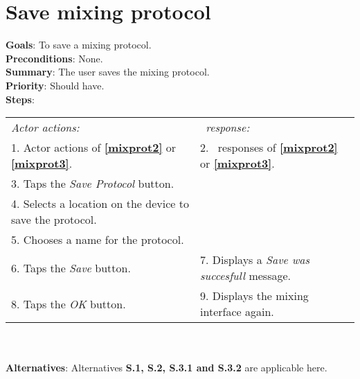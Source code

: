   \section{Save mixing protocol}
  \label{saveprot}
  \textbf{Goals}: To save a mixing protocol.\\
  \textbf{Preconditions}: None. \\
  \textbf{Summary}: The user saves the mixing protocol.\\
  \textbf{Priority}: Should have.\\
  \textbf{Steps}: \\
  \begin{tabular}{ p{} p{} }
  	\emph{Actor actions:} & \emph{\projectname\ response:} \\
  	1. Actor actions of \textbf{\ref{mixprot2}} or \textbf{\ref{mixprot3}}. & 2. \projectname\ responses of \textbf{\ref{mixprot2}} or \textbf{\ref{mixprot3}}. \\
    3. Taps the \emph{Save Protocol} button.  & \\
    4. Selects a location on the device to save the protocol. & \\
    5. Chooses a name for the protocol. & \\
    6. Taps the \emph{Save} button. & 7. Displays a \emph{Save was succesfull} message.\\
    8. Taps the \emph{OK} button. & 9. Displays the mixing interface again. \\
      \end{tabular}
    	 \\
    \\\textbf{Alternatives}: Alternatives \textbf{S.1, S.2, S.3.1 and S.3.2} are applicable here.
    
